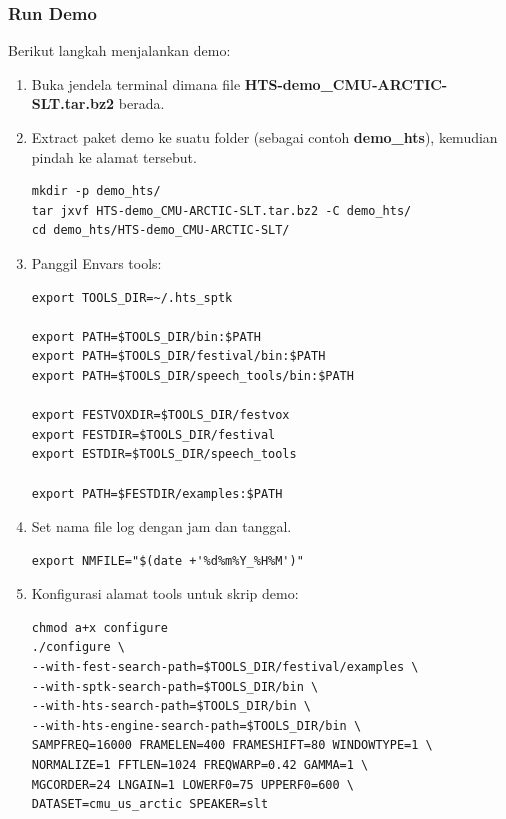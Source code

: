\documentclass[12pt,]{article}
\begin{document}
	\subsubsection{Run Demo}
	Berikut langkah menjalankan demo:

	\begin{enumerate}
		\item Buka jendela terminal dimana file \textbf{HTS-demo\_CMU-ARCTIC-SLT.tar.bz2} berada.

		\item Extract paket demo ke suatu folder (sebagai contoh \textbf{demo\_hts}), kemudian pindah ke alamat tersebut.
		\begin{verbatim}
mkdir -p demo_hts/
tar jxvf HTS-demo_CMU-ARCTIC-SLT.tar.bz2 -C demo_hts/
cd demo_hts/HTS-demo_CMU-ARCTIC-SLT/
		\end{verbatim}

		\item Panggil Envars tools:
		\begin{verbatim}
export TOOLS_DIR=~/.hts_sptk

export PATH=$TOOLS_DIR/bin:$PATH
export PATH=$TOOLS_DIR/festival/bin:$PATH
export PATH=$TOOLS_DIR/speech_tools/bin:$PATH

export FESTVOXDIR=$TOOLS_DIR/festvox
export FESTDIR=$TOOLS_DIR/festival
export ESTDIR=$TOOLS_DIR/speech_tools

export PATH=$FESTDIR/examples:$PATH
		\end{verbatim}

		\newpage
		\item Set nama file log dengan jam dan tanggal.
		\begin{verbatim}
export NMFILE="$(date +'%d%m%Y_%H%M')"
		\end{verbatim}

		\item Konfigurasi alamat tools untuk skrip demo:
		\begin{verbatim}
chmod a+x configure
./configure \
--with-fest-search-path=$TOOLS_DIR/festival/examples \
--with-sptk-search-path=$TOOLS_DIR/bin \
--with-hts-search-path=$TOOLS_DIR/bin \
--with-hts-engine-search-path=$TOOLS_DIR/bin \
SAMPFREQ=16000 FRAMELEN=400 FRAMESHIFT=80 WINDOWTYPE=1 \
NORMALIZE=1 FFTLEN=1024 FREQWARP=0.42 GAMMA=1 \
MGCORDER=24 LNGAIN=1 LOWERF0=75 UPPERF0=600 \
DATASET=cmu_us_arctic SPEAKER=slt
		\end{verbatim}


\end{enumerate}
\end{document}
